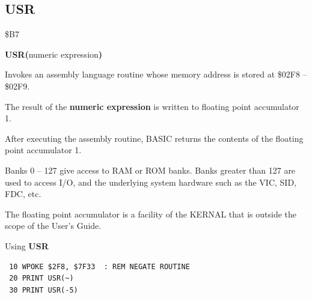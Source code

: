 \subsection{USR}
\begin{description}[leftmargin=2cm,style=nextline]
\item [Token:] \$B7
\item [Format:] {\bf USR(}numeric expression{\bf)}
\item [Usage:] Invokes an assembly language routine whose memory
               address is stored at  \$02F8 -- \$02F9.

               The result of the {\bf numeric expression}
               is written to floating point accumulator 1.

               After executing the assembly routine, BASIC returns
               the contents of the floating point accumulator 1.

\item [Remarks:] Banks 0 -- 127 give access to RAM or ROM banks.
                 Banks greater than 127 are used to access I/O, and the underlying system hardware such as the
                 VIC, SID, FDC, etc.

                 The floating point accumulator is a facility of the KERNAL
                 that is outside the scope of the User's Guide.

\item [Example:] Using {\bf USR}

\begin{tcolorbox}[colback=black,coltext=white]
\verbatimfont{\codefont}
\begin{verbatim}
 10 WPOKE $2F8, $7F33  : REM NEGATE ROUTINE
 20 PRINT USR(~)
 30 PRINT USR(-5)
\end{verbatim}
\end{tcolorbox}
\end{description}


\newpage
